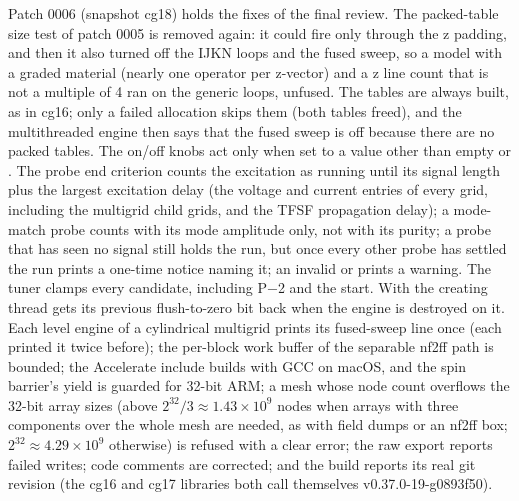 Patch 0006 (snapshot cg18) holds the fixes of the final review. The packed-table size test of patch 0005 is removed
again: it could fire only through the z padding, and then it also turned off the IJKN loops and the fused sweep, so a
model with a graded material (nearly one operator per z-vector) and a z line count that is not a multiple of 4 ran on
the generic loops, unfused. The tables are always built, as in cg16; only a failed allocation skips them (both tables
freed), and the multithreaded engine then says that the fused sweep is off because there are no packed tables. The
on/off knobs act only when set to a value other than empty or . The probe end criterion counts the excitation
as running until its signal length plus the largest excitation delay (the voltage and current entries of every grid,
including the multigrid child grids, and the TFSF propagation delay); a mode-match probe counts with its mode
amplitude only, not with its purity; a probe that has seen no signal still holds the run, but once every other probe
has settled the run prints a one-time notice naming it; an invalid  or
 prints a warning. The tuner clamps every candidate, including P$-$2 and the start.
With  the creating thread gets its previous flush-to-zero bit back when the engine is destroyed on
it. Each level engine of a cylindrical multigrid prints its fused-sweep line once (each printed it twice before); the
per-block work buffer of the separable nf2ff path is bounded; the Accelerate include builds with GCC on macOS, and the
spin barrier's yield is guarded for 32-bit ARM; a mesh whose node count overflows the 32-bit array sizes (above
$2^{32}/3 \approx 1.43\times10^9$ nodes when arrays with three components over the whole mesh are needed, as with
field dumps or an nf2ff box; $2^{32}\approx 4.29\times10^9$ otherwise) is refused with a clear error; the raw
 export reports failed writes; code comments are corrected; and the build reports its real
git revision (the cg16 and cg17 libraries both call themselves v0.37.0-19-g0893f50).

